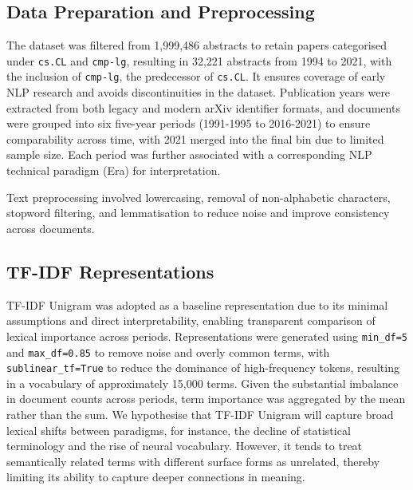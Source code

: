 \subsection{Data Preparation and Preprocessing}


The dataset was filtered from 1,999,486 abstracts to retain papers categorised under \texttt{cs.CL} and \texttt{cmp-lg}, resulting in 32,221 abstracts from 1994 to 2021, with the inclusion of \texttt{cmp-lg}, the predecessor of \texttt{cs.CL}. It ensures coverage of early NLP research and avoids discontinuities in the dataset. Publication years were extracted from both legacy and modern arXiv identifier formats, and documents were grouped into six five-year periods (1991-1995 to 2016-2021) to ensure comparability across time, with 2021 merged into the final bin due to limited sample size. Each period was further associated with a corresponding NLP technical paradigm (Era) for interpretation.


Text preprocessing involved lowercasing, removal of non-alphabetic characters, stopword filtering, and lemmatisation to reduce noise and improve consistency across documents.

\subsection{TF-IDF Representations}

TF-IDF Unigram was adopted as a baseline representation due to its minimal assumptions and direct interpretability, enabling transparent comparison of lexical importance across periods. Representations were generated using \texttt{min\_df=5} and \texttt{max\_df=0.85} to remove noise and overly common terms, with \texttt{sublinear\_tf=True} to reduce the dominance of high-frequency tokens, resulting in a vocabulary of approximately 15,000 terms. Given the substantial imbalance in document counts across periods, term importance was aggregated by the mean rather than the sum. We hypothesise that TF-IDF Unigram will capture broad lexical shifts between paradigms, for instance, the decline of statistical terminology and the rise of neural vocabulary. However, it tends to treat semantically related terms with different surface forms as unrelated, thereby limiting its ability to capture deeper connections in meaning.



